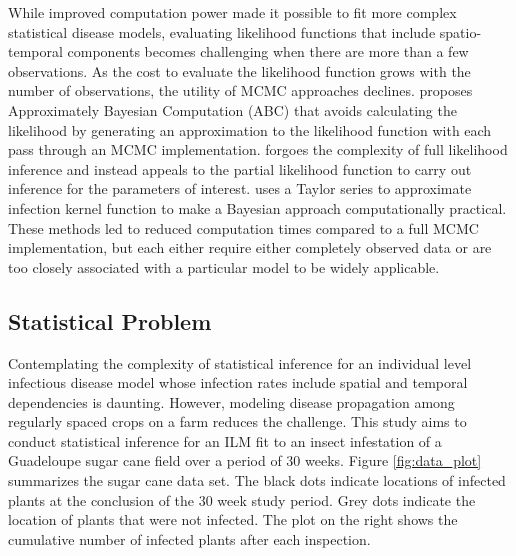 \documentclass{uwstat572}
\begin{document}
While improved computation power made it possible to fit more complex statistical disease models, evaluating likelihood functions that include spatio-temporal components becomes challenging when there are more than a few observations. 
As the cost to evaluate the likelihood function grows with the number of observations, the utility of MCMC approaches declines.
\citet{McKinley} proposes Approximately Bayesian Computation (ABC) that avoids calculating the likelihood by generating an approximation to the likelihood function with each pass through an MCMC implementation. 
\citet{Diggle} forgoes the complexity of full likelihood inference and instead appeals to the partial likelihood function to carry out inference for the parameters of interest. 
\citet{Deardon} uses a Taylor series to approximate infection kernel function to make a Bayesian approach computationally practical. 
These methods led to reduced computation times compared to a full MCMC implementation, but each either require either completely observed data or are too closely associated with a particular model to be widely applicable.

\subsection{Statistical Problem}
Contemplating the complexity of statistical inference for an individual level infectious disease model whose infection rates include spatial and temporal dependencies is daunting.
However, modeling disease propagation among regularly spaced crops on a farm reduces the challenge. 
This study aims to conduct statistical inference for an ILM fit to an insect infestation of a Guadeloupe sugar cane field over a period of 30 weeks.
Figure \ref{fig:data_plot} summarizes the sugar cane data set. 
The black dots indicate locations of infected plants at the conclusion of the 30 week study period. 
Grey dots indicate the location of plants that were not infected. 
The plot on the right shows the cumulative number of infected plants after each inspection.
\end{document}
